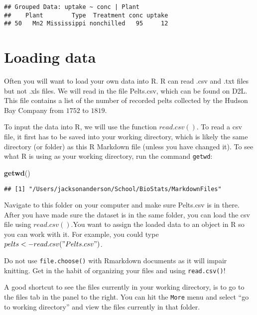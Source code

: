 \documentclass[]{article}
\newenvironment{Shaded}{\begin{snugshade}}{\end{snugshade}}
\newcommand{\KeywordTok}[1]{\textcolor[rgb]{0.13,0.29,0.53}{\textbf{#1}}}
\newcommand{\NormalTok}[1]{#1}
\begin{document}
\begin{verbatim}
## Grouped Data: uptake ~ conc | Plant
##    Plant        Type  Treatment conc uptake
## 50   Mn2 Mississippi nonchilled   95     12
\end{verbatim}

\hypertarget{loading-data}{%
\section{Loading data}\label{loading-data}}

Often you will want to load your own data into R. R can read .csv and
.txt files but not .xls files. We will read in the file Pelts.csv, which
can be found on D2L. This file contains a list of the number of recorded
pelts collected by the Hudson Bay Company from \(1752\) to \(1819\).

To input the data into R, we will use the function \(read.csv()\). To
read a csv file, it first has to be saved into your working directory,
which is likely the same directory (or folder) as this R Markdown file
(unless you have changed it). To see what R is using as your working
directory, run the command \texttt{getwd}:

\begin{Shaded}
\begin{Highlighting}[]
\KeywordTok{getwd}\NormalTok{()}
\end{Highlighting}
\end{Shaded}

\begin{verbatim}
## [1] "/Users/jacksonanderson/School/BioStats/MarkdownFiles"
\end{verbatim}

Navigate to this folder on your computer and make sure Pelts.csv is in
there. After you have made sure the dataset is in the same folder, you
can load the csv file using \(read.csv()\).You want to assign the loaded
data to an object in R so you can work with it. For example, you could
type \(pelts <- read.csv("Pelts.csv")\).

Do not use \texttt{file.choose()} with Rmarkdown documents as it will
impair knitting. Get in the habit of organizing your files and using
\texttt{read.csv()}!

A good shortcut to see the files currently in your working directory, is
to go to the files tab in the panel to the right. You can hit the
\texttt{More} menu and select ``go to working directory'' and view the
files currently in that folder.
\end{document}
